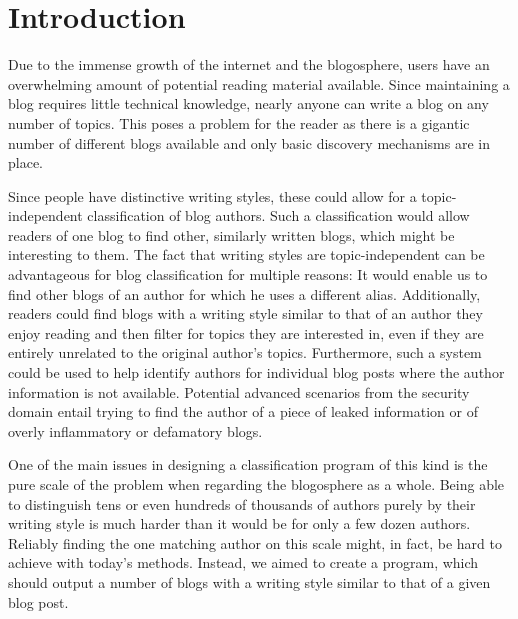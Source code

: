 
\section{Introduction}
\label{sec:introduction}

Due to the immense growth of the internet and the blogosphere, users have an overwhelming amount of potential reading material available.
Since maintaining a blog requires little technical knowledge, nearly anyone can write a blog on any number of topics.
This poses a problem for the reader as there is a gigantic number of different blogs available and only basic discovery mechanisms are in place.


Since people have distinctive writing styles, these could allow for a topic-independent classification of blog authors.
Such a classification would allow readers of one blog to find other, similarly written blogs, which might be interesting to them.
The fact that writing styles are topic-independent can be advantageous for blog classification for multiple reasons: It would enable us to find other blogs of an author for which he uses a different alias.
Additionally, readers could find blogs with a writing style similar to that of an author they enjoy reading and then filter for topics they are interested in, even if they are entirely unrelated to the original author's topics.
Furthermore, such a system could be used to help identify authors for individual blog posts where the author information is not available.
Potential advanced scenarios from the security domain entail trying to find the author of a piece of leaked information or of overly inflammatory or defamatory blogs.


One of the main issues in designing a classification program of this kind is the pure scale of the problem when regarding the blogosphere as a whole.
Being able to distinguish tens or even hundreds of thousands of authors purely by their writing style is much harder than it would be for only a few dozen authors.
Reliably finding the one matching author on this scale might, in fact, be hard to achieve with today's methods.
Instead, we aimed to create a program, which should output a number of blogs with a writing style similar to that of a given blog post.

